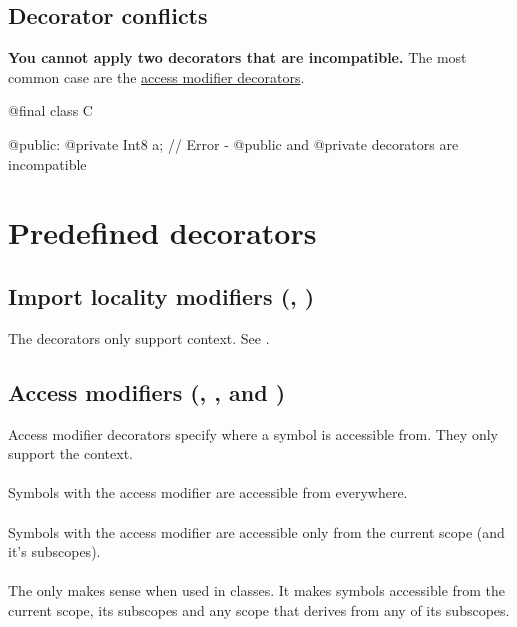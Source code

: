 \subsection{Decorator conflicts}
\textbf{You cannot apply two decorators that are incompatible.} The most common case are the \hyperref[accessModifierDecorators]{access modifier decorators}.
\begin{code}
@final class C {

@public:
	@private Int8 a; // Error - @public and @private decorators are incompatible
	
}
\end{code}

\section{Predefined decorators}

\subsection{Import locality modifiers (, )}
The decorators only support  context. See .

\subsection{Access modifiers (, ,  and )} \label{accessModifierDecorators}
Access modifier decorators specify where a symbol is accessible from. They only support the  context.

\paragraph{} \label{decorator:public} Symbols with the  access modifier are accessible from everywhere.

\paragraph{} \label{decorator:private} Symbols with the  access modifier are accessible only from the current scope (and it's subscopes).

\paragraph{} \label{decorator:protected} The  only makes sense when used in classes. It makes symbols accessible from the current scope, its subscopes and any scope that derives from any of its subscopes.

